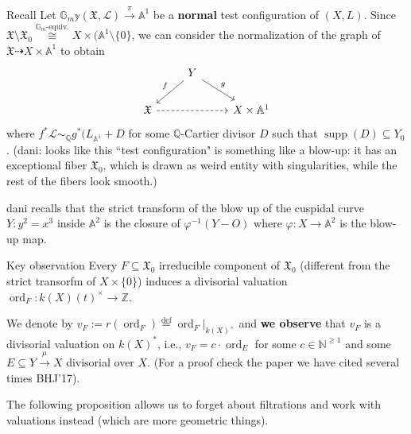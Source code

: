 \begin{thing7}{Recall}\leavevmode
Let \(\mathbb{G}_m \mathbb{y} (\mathfrak{X},\mathcal{L})\xrightarrow{\pi}\mathbb{A}^1\) be a \textbf{normal} test configuration of \((X,L)\). Since \(\mathfrak{X}\setminus \mathfrak{X}_0 \overset{\mathbb{G}_m\text{-equiv.} }{\cong}X \times (\mathbb{A}^1 \setminus\{0\}\), we can consider the normalization of the graph of \(\mathfrak{X} \dashrightarrow X \times \mathbb{A}^1\) to obtain
\[\begin{tikzcd}
&Y\arrow[dl,"f",swap]\arrow[dr,"g"]\\
\mathfrak{X}\arrow[rr,dashed]&&X \times \mathbb{A}^1
\end{tikzcd}\]
where \(f^*\mathcal{L} \sim_\mathbb{Q}g^* (L_{\mathbb{A}^1}+D\) for some \(\mathbb{Q}\)-Cartier divisor \(D\) such that \(\operatorname{supp}(D) \subseteq Y_0\). {\color{6}(dani: looks like this ``test configuration" is something like a blow-up: it has an exceptional fiber \(\mathfrak{X}_0\), which is drawn as weird entity with singularities, while the rest of the fibers look smooth.)}
\end{thing7}

\begin{thing7}{dani recalls}\leavevmode
that the strict transform of the blow up of the cuspidal curve \(Y:y^2=x^3\) inside \(\mathbb{A}^2\) is the closure of \(\varphi^{-1}(Y-O)\) where \(\varphi:X \to \mathbb{A}^2\) is the blow-up map.
\end{thing7}

\begin{thing8}{Key observation}\leavevmode
Every \(F \subseteq \mathfrak{X}_0\) irreducible component of \(\mathfrak{X}_0\) (different from the strict transorfm of \(X \times \{0\}\)) induces a divisorial valuation \(\operatorname{ord}_F: k (X)(t)^\times \longrightarrow \mathbb{Z}\).

We denote by \(v_F:= r (\operatorname{ord}_F)\overset{\operatorname{def}}{=} \operatorname{ord}_F |_{k(X)^\times}\) and \textbf{we observe} that \(v_F\) is a divisorial valuation on \(k(X)^*\), i.e., \(v_F=c\cdot \operatorname{ord}_E\) for some \(c \in \mathbb{N}^{\geq 1}\) and some \(E \subseteq Y \xrightarrow{\mu}X\) divisorial over \(X\). (For a proof check the paper we have cited several times BHJ'17).
\end{thing8}

The following proposition allows us to forget about filtrations and work with valuations instead (which are more geometric things).


